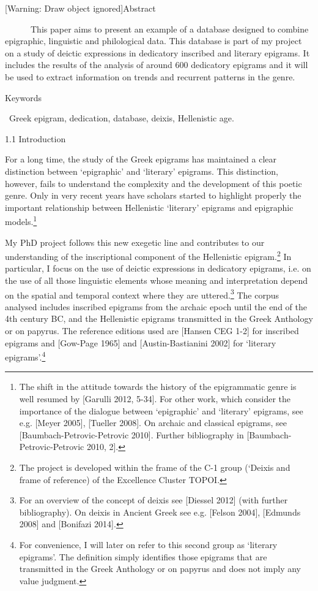 \documentclass[amsthm,ebook]{saparticle}
\title{}
\author{Flavia Licciardello}
\date{2015-11-20}
\begin{document}
[Warning: Draw object ignored]Abstract

\ \ \ \ \ \ This paper aims to present an example of a database designed to combine epigraphic, linguistic and
philological data. This database is part of my project on a study of deictic expressions in dedicatory inscribed and
literary epigrams. It includes the results of the analysis of around 600 dedicatory epigrams and it will be used to
extract information on trends and recurrent patterns in the genre.


\bigskip

Keywords

\ Greek epigram, dedication, database, deixis, Hellenistic age.


\bigskip

1.1 Introduction

For a long time, the study of the Greek epigrams has maintained a clear distinction between ‘epigraphic’ and ‘literary’
epigrams. This distinction, however, fails to understand the complexity and the development of this poetic genre. Only
in very recent years have scholars started to highlight properly the important relationship between Hellenistic
‘literary’ epigrams and epigraphic models.\footnote{ The shift in the attitude towards the history of the epigrammatic
genre is well resumed by [Garulli 2012, 5-34]. For other work, which consider the importance of the dialogue between
‘epigraphic’ and ‘literary’ epigrams, see e.g. [Meyer 2005], [Tueller 2008]. On archaic and classical epigrams, see
[Baumbach-Petrovic-Petrovic 2010]. Further bibliography in [Baumbach-Petrovic-Petrovic 2010, 2].} 

My PhD project follows this new exegetic line and contributes to our understanding of the inscriptional component of the
Hellenistic epigram.\footnote{ The project is developed within the frame of the C-1 group (‘Deixis and frame of
reference) of the Excellence Cluster TOPOI.} In particular, I focus on the use of deictic expressions in dedicatory
epigrams, i.e. on the use of all those linguistic elements whose meaning and interpretation depend on the spatial and
temporal context where they are uttered.\footnote{ For an overview of the concept of deixis see [Diessel 2012] (with
further bibliography). On deixis in Ancient Greek see e.g. [Felson 2004], [Edmunds 2008] and [Bonifazi 2014].} The
corpus analysed includes inscribed epigrams from the archaic epoch until the end of the 4th century BC, and the
Hellenistic epigrams transmitted in the Greek Anthology or on papyrus. The reference editions used are [Hansen CEG 1-2]
for inscribed epigrams and [Gow-Page 1965] and [Austin-Bastianini 2002] for ‘literary epigrams’.\footnote{ For
convenience, I will later on refer to this second group as ‘literary epigrams’. The definition simply identifies those
epigrams that are transmitted in the Greek Anthology or on papyrus and does not imply any value judgment.} 
\end{document}
